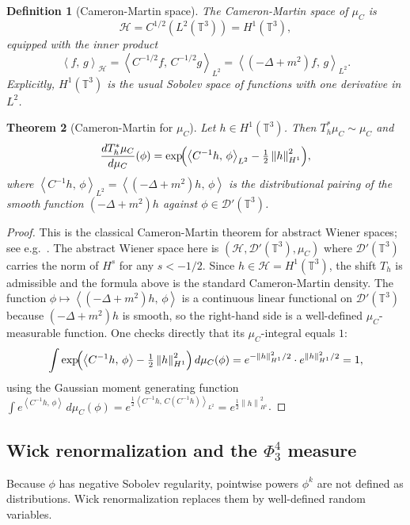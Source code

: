 \documentclass[12pt]{article}
\newtheorem{theorem}{Theorem}[section]
\newtheorem{definition}[theorem]{Definition}
\newcommand{\T}{\mathbb{T}}
\newcommand{\Dc}{\mathcal{D}}
\newcommand{\Hc}{\mathcal{H}}
\newcommand{\norm}[1]{\left\|#1\right\|}
\newcommand{\ip}[2]{\left\langle #1,\, #2 \right\rangle}
\begin{document}
\begin{definition}[Cameron-Martin space]\label{def:CM}
The \emph{Cameron-Martin space} of $\mu_C$ is
\[
  \Hc = C^{1/2}(L^2(\T^3)) = H^1(\T^3),
\]
equipped with the inner product
\[
  \ip{f}{g}_{\Hc} = \ip{C^{-1/2}f}{C^{-1/2}g}_{L^2}
  = \ip{(-\Delta+m^2)f}{g}_{L^2}.
\]
Explicitly, $H^1(\T^3)$ is the usual Sobolev space of functions with one derivative in $L^2$.
\end{definition}

\begin{theorem}[Cameron-Martin for $\mu_C$]\label{thm:CM}
Let $h\in H^1(\T^3)$.  Then $T_h^*\mu_C\sim\mu_C$ and
\[
  \frac{dT_h^*\mu_C}{d\mu_C}(\phi)
  = \exp\!\Bigl(\ip{C^{-1}h}{\phi}_{L^2} - \tfrac{1}{2}\norm{h}_{H^1}^2\Bigr),
\]
where $\ip{C^{-1}h}{\phi}_{L^2} = \ip{(-\Delta+m^2)h}{\phi}$ is the distributional pairing
of the smooth function $(-\Delta+m^2)h$ against $\phi\in\Dc'(\T^3)$.
\end{theorem}

\begin{proof}
This is the classical Cameron-Martin theorem for abstract Wiener spaces; see
e.g.\ \cite[Theorem~4.1]{Bogachev1998}.  The abstract Wiener space here is
$(\Hc, \Dc'(\T^3), \mu_C)$ where $\Dc'(\T^3)$ carries the norm of $H^s$ for any $s<-1/2$.
Since $h\in\Hc=H^1(\T^3)$, the shift $T_h$ is admissible and the formula above is the
standard Cameron-Martin density.  The function $\phi\mapsto\ip{(-\Delta+m^2)h}{\phi}$ is a
continuous linear functional on $\Dc'(\T^3)$ because $(-\Delta+m^2)h$ is smooth, so the
right-hand side is a well-defined $\mu_C$-measurable function.  One checks directly that its
$\mu_C$-integral equals $1$:
\[
  \int \exp\!\Bigl(\ip{C^{-1}h}{\phi} - \tfrac{1}{2}\norm{h}_{H^1}^2\Bigr)\,d\mu_C(\phi)
  = e^{-\norm{h}_{H^1}^2/2} \cdot e^{\norm{h}_{H^1}^2/2} = 1,
\]
using the Gaussian moment generating function
$\int e^{\ip{C^{-1}h}{\phi}}\,d\mu_C(\phi) = e^{\frac{1}{2}\ip{C^{-1}h}{C(C^{-1}h)}_{L^2}}
= e^{\frac{1}{2}\norm{h}_{H^1}^2}$.
\end{proof}

\subsection{Wick renormalization and the $\Phi^4_3$ measure}

Because $\phi$ has negative Sobolev regularity, pointwise powers $\phi^k$ are not defined as
distributions.  Wick renormalization replaces them by well-defined random variables.
\end{document}
